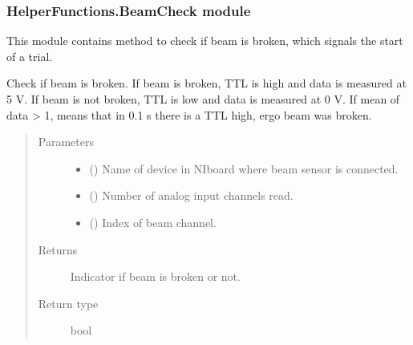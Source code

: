 \documentclass[letterpaper,10pt,english]{sphinxmanual}
\begin{document}
\subsubsection{HelperFunctions.BeamCheck module}
\label{\detokenize{NoSeMazeControl/HelperFunctions:module-HelperFunctions.BeamCheck}}\label{\detokenize{NoSeMazeControl/HelperFunctions:helperfunctions-beamcheck-module}}
\sphinxAtStartPar
This module contains method to check if beam is broken, which signals the start
of a trial.

\begin{fulllineitems}
\label{\detokenize{NoSeMazeControl/HelperFunctions:HelperFunctions.BeamCheck.check_beam}}
\pysigstartsignatures
{}
\pysigstopsignatures
\sphinxAtStartPar
Check if beam is broken. If beam is broken, TTL is high and data is
measured at 5 V. If beam is not broken, TTL is low and data is measured at
0 V. If mean of data \textgreater{} 1, means that in 0.1 s there is a TTL high, ergo
beam was broken.
\begin{quote}\begin{description}
\item[{Parameters}] \leavevmode\begin{itemize}
\item {} 
\sphinxAtStartPar
{} () \textendash{} Name of device in NI\sphinxhyphen{}board where beam sensor is connected.

\item {} 
\sphinxAtStartPar
{} () \textendash{} Number of analog input channels read.

\item {} 
\sphinxAtStartPar
{} () \textendash{} Index of beam channel.

\end{itemize}

\item[{Returns}] \leavevmode
\sphinxAtStartPar
{} \textendash{} Indicator if beam is broken or not.

\item[{Return type}] \leavevmode
\sphinxAtStartPar
bool

\end{description}\end{quote}

\end{fulllineitems}
\end{document}
